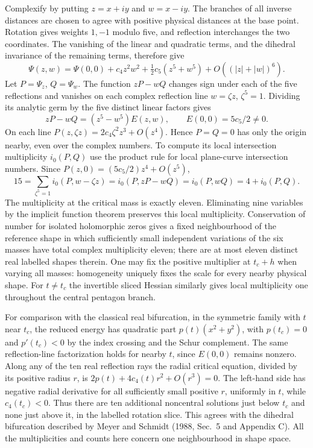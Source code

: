 \documentclass[11pt]{article}
\begin{document}
Complexify by putting $z=x+iy$ and $w=x-iy$. The branches of all inverse
distances are chosen to agree with positive physical distances at the
base point. Rotation gives weights $1,-1$ modulo five, and reflection
interchanges the two coordinates. The vanishing of the linear and
quadratic terms, and the dihedral invariance of the remaining terms,
therefore give
\[
 \Psi(z,w)=\Psi(0,0)+c_4z^2w^2+\tfrac12 c_5(z^5+w^5)
                 +O((|z|+|w|)^6).
\]
Let $P=\Psi_z$, $Q=\Psi_w$. The function $zP-wQ$ changes sign under
each of the five reflections and vanishes on each complex reflection
line $w=\zeta z$, $\zeta^5=1$. Dividing its analytic germ by the five
distinct linear factors gives
\[
 zP-wQ=(z^5-w^5)E(z,w),\qquad E(0,0)=5c_5/2\ne0.
\]
On each line $P(z,\zeta z)=2c_4\zeta^2z^3+O(z^4)$. Hence $P=Q=0$
has only the origin nearby, even over the complex numbers. To compute its
local intersection multiplicity $i_0(P,Q)$ use the product rule for local
plane-curve intersection numbers. Since $P(z,0)=(5c_5/2)z^4+O(z^5)$,
\[
 15=\sum_{\zeta^5=1}i_0(P,w-\zeta z)
    =i_0(P,zP-wQ)=i_0(P,wQ)=4+i_0(P,Q).
\]
The multiplicity at the critical mass is exactly eleven. Eliminating nine
variables by the implicit function theorem preserves this local multiplicity.
Conservation of number for isolated holomorphic zeros gives a fixed
neighbourhood of the reference shape in which sufficiently small
independent variations of the six masses have total complex multiplicity
eleven; there are at most eleven distinct real labelled shapes therein.
One may fix the positive multiplier at $t_c+h$ when varying all masses:
homogeneity uniquely fixes the scale for every nearby physical shape.
For $t\ne t_c$ the invertible sliced Hessian similarly gives local
multiplicity one throughout the central pentagon branch.

For comparison with the classical real bifurcation, in the symmetric family
with $t$ near $t_c$, the reduced energy has quadratic part $p(t)(x^2+y^2)$,
with $p(t_c)=0$ and $p'(t_c)<0$ by the index crossing and the Schur
complement. The same reflection-line factorization holds for nearby
$t$, since $E(0,0)$ remains nonzero. Along any of the ten real reflection
rays the radial critical equation, divided by its positive radius $r$,
is $2p(t)+4c_4(t)r^2+O(r^3)=0$. The left-hand side has negative
radial derivative for all sufficiently small positive $r$, uniformly
in $t$, while $c_4(t_c)<0$. Thus there are ten additional noncentral
solutions just below $t_c$ and none just above it, in the labelled
rotation slice. This agrees with the dihedral bifurcation described by
Meyer and Schmidt (1988, Sec.\ 5 and Appendix C). All the multiplicities
and counts here concern one neighbourhood in shape space.
\end{document}
